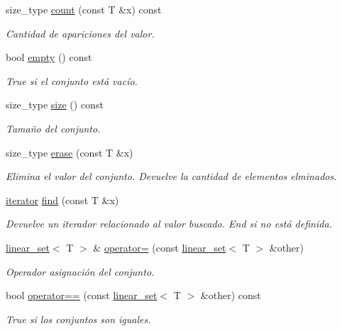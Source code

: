 \begin{DoxyCompactItemize}
size\+\_\+type \mbox{\hyperlink{classlinear__set_a5f61fef1dce039b252941854b6eddbfe}{count}} (const T \&x) const
\begin{DoxyCompactList}\small\item\em Cantidad de apariciones del valor. \end{DoxyCompactList}\item 
bool \mbox{\hyperlink{classlinear__set_a3f78f76d16b8570efa01319dad8d1834}{empty}} () const
\begin{DoxyCompactList}\small\item\em True si el conjunto está vacío. \end{DoxyCompactList}\item 
size\+\_\+type \mbox{\hyperlink{classlinear__set_aa20eaba8c492bb3b93c63384c0b55e58}{size}} () const
\begin{DoxyCompactList}\small\item\em Tamaño del conjunto. \end{DoxyCompactList}\item 
size\+\_\+type \mbox{\hyperlink{classlinear__set_a264d97735943af5490e73e469c3e7303}{erase}} (const T \&x)
\begin{DoxyCompactList}\small\item\em Elimina el valor del conjunto. Devuelve la cantidad de elementos elminados. \end{DoxyCompactList}\item 
\mbox{\hyperlink{classlinear__set_1_1iterator}{iterator}} \mbox{\hyperlink{classlinear__set_a415e0c8461f6a702129b7612a538ffb1}{find}} (const T \&x)
\begin{DoxyCompactList}\small\item\em Devuelve un iterador relacionado al valor buscado. End si no está definida. \end{DoxyCompactList}\item 
\mbox{\hyperlink{classlinear__set}{linear\+\_\+set}}$<$ T $>$ \& \mbox{\hyperlink{classlinear__set_a5bea24f94c4ea45550ec4b066ffb8cf1}{operator=}} (const \mbox{\hyperlink{classlinear__set}{linear\+\_\+set}}$<$ T $>$ \&other)
\begin{DoxyCompactList}\small\item\em Operador asignación del conjunto. \end{DoxyCompactList}\item 
bool \mbox{\hyperlink{classlinear__set_a49b9debdaaca2478d5df6c1f0fffab33}{operator==}} (const \mbox{\hyperlink{classlinear__set}{linear\+\_\+set}}$<$ T $>$ \&other) const
\begin{DoxyCompactList}\small\item\em True si los conjuntos son iguales. \end{DoxyCompactList}\item 

\end{DoxyCompactItemize}
